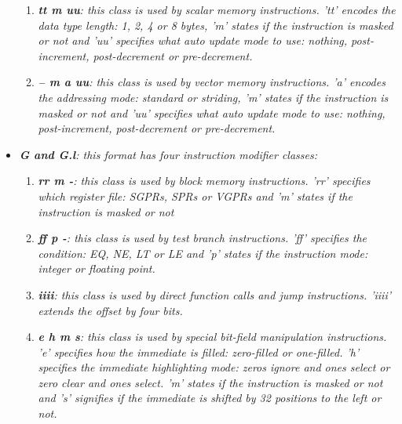 \documentclass{article}
\begin{document}
\begin{itemize}
                    \begin{enumerate}

                        \item \textit{\textbf{tt m uu}: this class is used by scalar memory instructions. 'tt' encodes the data type length: 1, 2, 4 or 8 bytes, 'm' states if the instruction is masked or not and 'uu' specifies what auto update mode to use: nothing, post-increment, post-decrement or pre-decrement.}

                        \item \textit{\textbf{-- m a uu}: this class is used by vector memory instructions. 'a' encodes the addressing mode: standard or striding, 'm' states if the instruction is masked or not and 'uu' specifies what auto update mode to use: nothing, post-increment, post-decrement or pre-decrement.}

                    \end{enumerate}

                \item \textit{\textbf{G and G.l}: this format has four instruction modifier classes:}

                    \begin{enumerate}

                        \item \textit{\textbf{rr m -}: this class is used by block memory instructions. 'rr' specifies which register file: SGPRs, SPRs or VGPRs and 'm' states if the instruction is masked or not}

                        \item \textit{\textbf{ff p -}: this class is used by test branch instructions. 'ff' specifies the condition: EQ, NE, LT or LE and 'p' states if the instruction mode: integer or floating point.}

                        \item \textit{\textbf{iiii}: this class is used by direct function calls and jump instructions. 'iiii' extends the offset by four bits.}

                        \item \textit{\textbf{e h m s}: this class is used by special bit-field manipulation instructions. 'e' specifies how the immediate is filled: zero-filled or one-filled. 'h' specifies the immediate highlighting mode: zeros ignore and ones select or zero clear and ones select. 'm' states if the instruction is masked or not and 's' signifies if the immediate is shifted by 32 positions to the left or not.}


\end{enumerate}
\end{itemize}
\end{document}
